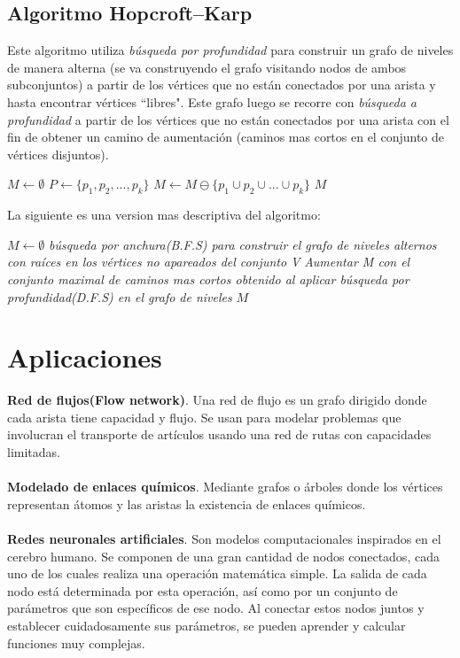 \documentclass[12pt,a4paper]{article}
\begin{document}
\subsection{Algoritmo Hopcroft–Karp}
Este algoritmo utiliza \textit{búsqueda por profundidad} para construir un grafo de niveles de manera alterna (se va construyendo el grafo visitando nodos de ambos subconjuntos) a partir de los vértices que no están conectados por una arista y hasta encontrar vértices ``libres". Este grafo luego se recorre con \textit{búsqueda a profundidad} a partir de los vértices que no están conectados por una arista con el fin de obtener un camino de aumentación (caminos mas cortos en el conjunto de vértices disjuntos).

\begin{center}
	\begin{algorithmic}[1]
		\STATE $M\gets \emptyset$
		\REPEAT
			\STATE $P\gets \{p_1, p_2, ..., p_k\}$
			\STATE $M\gets M \ominus \{p_1 \cup p_2 \cup ... \cup p_k\}$
	\RETURN $M$
	\end{algorithmic}
\end{center}

\noindent La siguiente es una version mas descriptiva del algoritmo:

\begin{center}
	\begin{algorithmic}[1]
		\STATE $M\gets \emptyset$
		\REPEAT
			\STATE \textit{búsqueda por anchura(B.F.S) para construir el grafo de niveles alternos con raíces en los vértices no apareados del conjunto V}
			\STATE \textit{Aumentar M con el conjunto maximal de caminos mas cortos obtenido al aplicar búsqueda por profundidad(D.F.S) en el grafo de niveles}
		\RETURN $M$
	\end{algorithmic}
\end{center}

\section{Aplicaciones} \noindent
\textbf{Red de flujos(Flow network)}. Una red de flujo es un grafo dirigido donde cada arista tiene capacidad y flujo. Se usan para modelar problemas que involucran el transporte de artículos usando una red de rutas con capacidades limitadas.\\\\
\textbf{Modelado de enlaces químicos}. Mediante grafos o árboles donde los vértices representan átomos y las aristas la existencia de enlaces químicos.\\\\
\textbf{Redes neuronales artificiales}. Son modelos computacionales inspirados en el cerebro humano. Se componen de una gran cantidad de nodos conectados, cada uno de los cuales realiza una operación matemática simple. La salida de cada nodo está determinada por esta operación, así como por un conjunto de parámetros que son específicos de ese nodo. Al conectar estos nodos juntos y establecer cuidadosamente sus parámetros, se pueden aprender y calcular funciones muy complejas.
\end{document}
